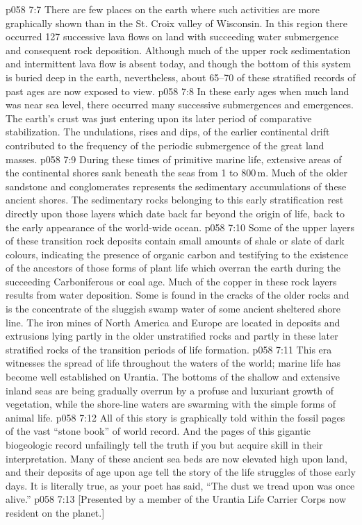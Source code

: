 \vs p058 7:7 There are few places on the earth where such activities are more graphically shown than in the St. Croix valley of Wisconsin. In this region there occurred 127 successive lava flows on land with succeeding water submergence and consequent rock deposition. Although much of the upper rock sedimentation and intermittent lava flow is absent today, and though the bottom of this system is buried deep in the earth, nevertheless, about 65--70 of these stratified records of past ages are now exposed to view.
\vs p058 7:8 \pc In these early ages when much land was near sea level, there occurred many successive submergences and emergences. The earth’s crust was just entering upon its later period of comparative stabilization. The undulations, rises and dips, of the earlier continental drift contributed to the frequency of the periodic submergence of the great land masses.
\vs p058 7:9 During these times of primitive marine life, extensive areas of the continental shores sank beneath the seas from 1 to 800\,m. Much of the older sandstone and conglomerates represents the sedimentary accumulations of these ancient shores. The sedimentary rocks belonging to this early stratification rest directly upon those layers which date back far beyond the origin of life, back to the early appearance of the world\hyp{}wide ocean.
\vs p058 7:10 Some of the upper layers of these transition rock deposits contain small amounts of shale or slate of dark colours, indicating the presence of organic carbon and testifying to the existence of the ancestors of those forms of plant life which overran the earth during the succeeding Carboniferous or coal age. Much of the copper in these rock layers results from water deposition. Some is found in the cracks of the older rocks and is the concentrate of the sluggish swamp water of some ancient sheltered shore line. The iron mines of North America and Europe are located in deposits and extrusions lying partly in the older unstratified rocks and partly in these later stratified rocks of the transition periods of life formation.
\vs p058 7:11 \pc This era witnesses the spread of life throughout the waters of the world; marine life has become well established on Urantia. The bottoms of the shallow and extensive inland seas are being gradually overrun by a profuse and luxuriant growth of vegetation, while the shore\hyp{}line waters are swarming with the simple forms of animal life.
\vs p058 7:12 \pc All of this story is graphically told within the fossil pages of the vast “stone book” of world record. And the pages of this gigantic biogeologic record unfailingly tell the truth if you but acquire skill in their interpretation. Many of these ancient sea beds are now elevated high upon land, and their deposits of age upon age tell the story of the life struggles of those early days. It is literally true, as your poet has said, “The dust we tread upon was once alive.”
\vsetoff
\vs p058 7:13 [Presented by a member of the Urantia Life Carrier Corps now resident on the planet.]
